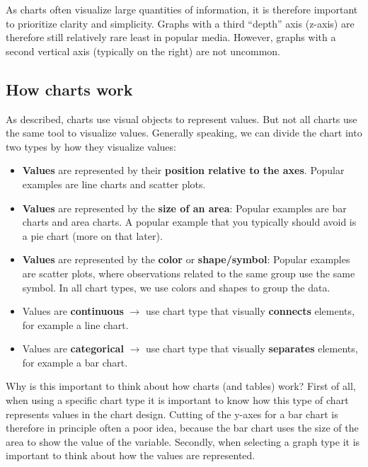 \documentclass[]{book}
\begin{document}
As charts often visualize large quantities of information, it is therefore important to prioritize clarity and simplicity. Graphs with a third ``depth'' axis (z-axis) are therefore still relatively rare least in popular media. However, graphs with a second vertical axis (typically on the right) are not uncommon.

\hypertarget{how-charts-work}{%
\subsection{How charts work}\label{how-charts-work}}

As described, charts use visual objects to represent values. But not all charts use the same tool to visualize values. Generally speaking, we can divide the chart into two types by how they visualize values:

\begin{itemize}
\item
  \textbf{Values} are represented by their \textbf{position relative to the axes}. Popular examples are line charts and scatter plots.
\item
  \textbf{Values} are represented by the \textbf{size of an area}: Popular examples are bar charts and area charts. A popular example that you typically should avoid is a pie chart (more on that later).
\item
  \textbf{Values} are represented by the \textbf{color} or \textbf{shape/symbol}: Popular examples are scatter plots, where observations related to the same group use the same symbol. In all chart types, we use colors and shapes to group the data.
\item
  Values are \textbf{continuous} \(\rightarrow\) use chart type that visually \textbf{connects} elements, for example a line chart.
\item
  Values are \textbf{categorical} \(\rightarrow\) use chart type that visually \textbf{separates} elements, for example a bar chart.
\end{itemize}

Why is this important to think about how charts (and tables) work? First of all, when using a specific chart type it is important to know how this type of chart represents values in the chart design. Cutting of the y-axes for a bar chart is therefore in principle often a poor idea, because the bar chart uses the size of the area to show the value of the variable. Secondly, when selecting a graph type it is important to think about how the values are represented.
\end{document}
